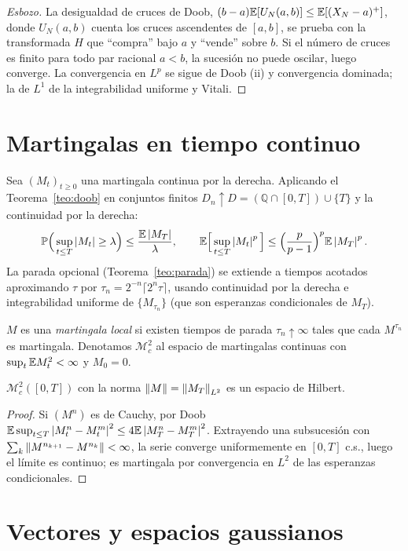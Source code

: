 \begin{proof}[Esbozo]
La desigualdad de cruces de Doob, $(b-a)\mathbb{E}[U_N(a,b)]\le\mathbb{E}[(X_N-a)^+]$, donde $U_N(a,b)$
cuenta los cruces ascendentes de $[a,b]$, se prueba con la transformada $H$ que ``compra'' bajo $a$
y ``vende'' sobre $b$. Si el número de cruces es finito para todo par racional $a<b$, la sucesión
no puede oscilar, luego converge. La convergencia en $L^p$ se sigue de Doob (ii) y convergencia
dominada; la de $L^1$ de la integrabilidad uniforme y Vitali.
\end{proof}

\section{Martingalas en tiempo continuo}
Sea $(M_t)_{t\ge0}$ una martingala continua por la derecha. Aplicando el Teorema~\ref{teo:doob} en conjuntos
finitos $D_n\uparrow D=(\mathbb Q\cap[0,T])\cup\{T\}$ y la continuidad por la derecha:
\[
  \mathbb{P}\Big(\sup_{t\le T}\left\lvert M_t\right\rvert\ge\lambda\Big)\le\frac{\mathbb{E}\left\lvert M_T\right\rvert}{\lambda},\qquad
  \mathbb{E}\Big[\sup_{t\le T}\left\lvert M_t\right\rvert^p\Big]\le\Big(\frac{p}{p-1}\Big)^p\mathbb{E}\left\lvert M_T\right\rvert^p.
\]
La parada opcional (Teorema~\ref{teo:parada}) se extiende a tiempos acotados aproximando $\tau$ por $\tau_n=
2^{-n}\lceil2^n\tau\rceil$, usando continuidad por la derecha e integrabilidad uniforme de $\{M_{\tau_n}\}$ (que son
esperanzas condicionales de $M_T$).

\begin{definicion}
$M$ es una \emph{martingala local} si existen tiempos de parada $\tau_n\uparrow\infty$ tales
que cada $M^{\tau_n}$ es martingala. Denotamos $\mathcal M^2_c$ al espacio de martingalas continuas con
$\sup_t\mathbb{E} M_t^2<\infty$ y $M_0=0$.
\end{definicion}

\begin{proposicion}\label{prop:M2c}
$\mathcal M^2_c([0,T])$ con la norma $\left\lVert M\right\rVert=\left\lVert M_T\right\rVert_{L^2}$ es un espacio de Hilbert.
\end{proposicion}

\begin{proof}
Si $(M^n)$ es de Cauchy, por Doob $\mathbb{E}\sup_{t\le T}\left\lvert M^n_t-M^m_t\right\rvert^2\le4\mathbb{E}\left\lvert M^n_T-M^m_T\right\rvert^2$.
Extrayendo una subsucesión con $\sum_k\left\lVert M^{n_{k+1}}-M^{n_k}\right\rVert<\infty$, la serie converge uniformemente en
$[0,T]$ c.s., luego el límite es continuo; es martingala por convergencia en $L^2$ de las esperanzas
condicionales.
\end{proof}

\section{Vectores y espacios gaussianos}

